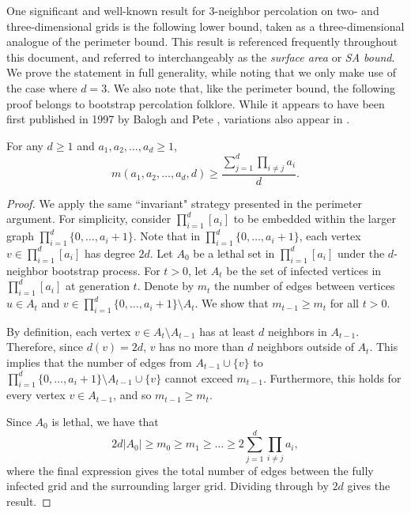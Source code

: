 One significant and well-known result for 3-neighbor percolation on two- and three-dimensional grids is the following lower bound, taken as a three-dimensional analogue of the perimeter bound. This result is referenced frequently throughout this document, and referred to interchangeably as the \emph{surface area} or \emph{SA bound}. We prove the statement in full generality, while noting that we only make use of the case where $d=3$. We also note that, like the perimeter bound, the following proof belongs to bootstrap percolation folklore. While it appears to have been first published in 1997 by Balogh and Pete \cite{balogh1998random}, variations also appear in \cite{bollobas2006coffee,pete:1997,pete1997make}.

\begin{thm}
\label{thm:sa_bound}
For any $d \geq 1$ and $a_1, a_2, \dots, a_d \geq 1$, 
$$m(a_1,a_2, \dots, a_d,d) \geq \frac{\sum_{j=1}^d \prod_{i \neq j} a_i}{d}.$$
\end{thm}

\begin{proof}
We apply the same ``invariant" strategy presented in the perimeter argument. For simplicity, consider $\prod_{i=1}^d[a_i]$ to be embedded within the larger graph $\prod_{i=1}^d \{0, \dots, a_i + 1\}$. Note that in $\prod_{i=1}^d \{0, \dots, a_i + 1\}$, each vertex $v \in \prod_{i=1}^d[a_i]$ has degree $2d$. Let $A_0$ be a lethal set in $\prod_{i=1}^d[a_i]$ under the $d$-neighbor bootstrap process. For $t >0$, let $A_t$ be the set of infected vertices in $\prod_{i=1}^d[a_i]$ at generation $t$. Denote by $m_t$ the number of edges between vertices $u \in A_t$ and $v \in \prod_{i=1}^d \{0, \dots, a_i + 1\} \setminus A_t$. %
We show that $m_{t-1} \geq m_t$ for all $t> 0$. 

By definition, each vertex $v \in A_t \setminus A_{t-1}$ has at least $d$ neighbors in $A_{t-1}$. Therefore, since $d(v) = 2d$, $v$ has no more than $d$ neighbors outside of $A_t$. This implies that the number of edges from $A_{t-1} \cup \{v\}$ to $\prod_{i=1}^d \{0, \dots, a_i + 1\} \setminus A_{t-1} \cup \{v\}$ cannot exceed $m_{t-1}$. Furthermore, this holds for every vertex $v \in A_{t-1}$, and so $m_{t-1} \geq m_t$. 

Since $A_0$ is lethal, we have that 
$$2d|A_0| \geq m_0 \geq m_1 \geq \dots \geq 2 \sum_{j=1}^d \prod_{i \neq j} a_i,$$ 
where the final expression gives the total number of edges between the fully infected grid and the surrounding larger grid. Dividing through by $2d$ gives the result.
\end{proof}

